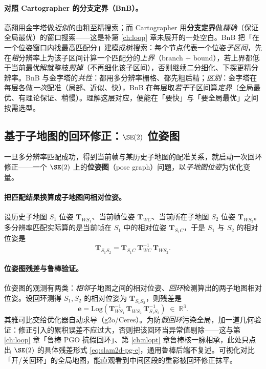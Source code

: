 \paragraph{对照 Cartographer 的分支定界（BnB）。}
高翔用金字塔做\emph{近似}的由粗至精搜索；而 Cartographer\cite{hess2016cartographer} 用\textbf{分支定界}做\emph{精确}（保证全局最优）的窗口搜索——这是补第 \cref{ch:loop} 章未展开的一处空白。BnB 把「在一个位姿窗口内找最高匹配分」建模成树搜索：每个节点代表一个位姿\emph{子区间}，先在\emph{粗}分辨率上为该子区间计算一个匹配分的\emph{上界}（branch + bound），若上界都低于当前最优解就整枝\emph{剪掉}（不再细化该子区间），否则继续二分细化、下探更精分辨率。BnB 与金字塔的\emph{共性}：都用多分辨率栅格、都先粗后精；\emph{区别}：金字塔在每层各做\emph{一次}配准（局部、近似、快），BnB 在每层取\emph{若干}子区间算\emph{定界}（全局最优、有理论保证、稍慢）。理解这层对应，便能在「要快」与「要全局最优」之间按需选型。

\subsection{基于子地图的回环修正：\texorpdfstring{$\SE(2)$}{SE(2)} 位姿图}
\label{sec:slam2d-pgo}

一旦多分辨率匹配成功，得到当前帧与某历史子地图的配准关系，就启动一次回环修正——一个 $\SE(2)$ 上的\textbf{位姿图}（pose graph）问题，以\emph{子地图位姿}为优化变量。

\paragraph{把匹配结果换算成子地图间相对位姿。}
设历史子地图 $S_1$ 位姿 $\mathbf{T}_{WS_1}$、当前帧位姿 $\mathbf{T}_{WC}$、当前所在子地图 $S_2$ 位姿 $\mathbf{T}_{WS_2}$。多分辨率匹配实际算的是当前帧在 $S_1$ 中的相对位姿 $\mathbf{T}_{S_1 C}$，于是 $S_1$ 与 $S_2$ 的相对位姿是
\begin{equation}
\mathbf{T}_{S_1 S_2}=\mathbf{T}_{S_1 C}\,\mathbf{T}_{WC}^{-1}\,\mathbf{T}_{WS_2}.
\label{eq:slam2d-Ts1s2}
\end{equation}

\paragraph{位姿图残差与鲁棒验证。}
位姿图的观测有两类：\emph{相邻}子地图之间的相对位姿、\emph{回环}检测算出的两子地图相对位姿。设回环测得 $S_1,S_2$ 的相对位姿为 $\mathbf{T}_{S_1 S_2}$，则残差是
\begin{equation}
\mathbf{e}=\mathrm{Log}\!\left(\mathbf{T}_{WS_1}^{-1}\,\mathbf{T}_{WS_2}\,\mathbf{T}_{S_1 S_2}^{-1}\right)\;\in\;\mathbb{R}^3.
\label{eq:slam2d-pg-e}
\end{equation}
其雅可比交给优化器自动求导（g2o/Ceres）。为防\emph{假回环}污染全局，加一道几何验证：修正引入的累积误差不应过大，否则把该回环当异常值剔除——这与第 \cref{ch:loop} 章「鲁棒 PGO 抗假回环」、第 \cref{ch:nlopt} 章鲁棒核一脉相承，此处只点出 $\SE(2)$ 的具体残差形式 \cref{eq:slam2d-pg-e}，通用鲁棒后端不复述。可视化对比「开/关回环」的全局地图，能直观看到中间区段的重影被回环修正抹平。


